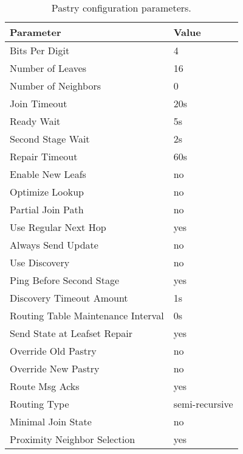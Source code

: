 \begin{table}[phtb]
\centering
\begin{tabular}{|l|l|}
\hline
Parameter                       & Value\\
\hline
Bits Per Digit                  & 4\\
Number of Leaves                & 16\\
Number of Neighbors             & 0\\
Join Timeout                    & 20s\\
Ready Wait                      & 5s\\
Second Stage Wait               & 2s\\
Repair Timeout                  & 60s\\
Enable New Leafs                & no\\
Optimize Lookup                 & no\\
Partial Join Path               & no\\
Use Regular Next Hop            & yes\\
Always Send Update              & no\\
Use Discovery                   & no\\
Ping Before Second Stage        & yes\\
Discovery Timeout Amount        & 1s\\
Routing Table Maintenance Interval & 0s\\
Send State at Leafset Repair    & yes\\
Override Old Pastry             & no\\
Override New Pastry             & no\\
Route Msg Acks                  & yes\\
Routing Type                    & semi-recursive\\
Minimal Join State              & no\\
Proximity Neighbor Selection    & yes\\
\hline
\end{tabular}
\caption{Pastry configuration parameters.}
\label{tab_pastry_configs}
\end{table}

